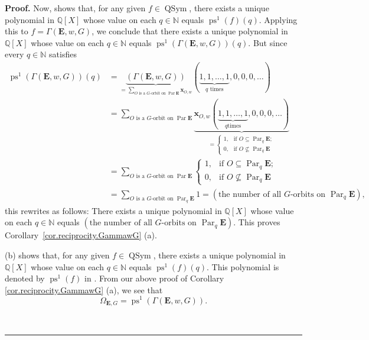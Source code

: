 \documentclass[numbers=enddot,12pt,final,onecolumn,notitlepage,abstracton]{scrartcl}
\theoremstyle{definition}
\newenvironment{proof}[1][Proof]{\noindent\textbf{#1.} }{\ \rule{0.5em}{0.5em}}
\let\sumnonlimits\sum
\renewcommand{\sum}{\sumnonlimits\limits}
\newcommand{\xx}{{\mathbf{x}}}
\newcommand{\QSym}{{\operatorname{QSym}}}
\newcommand{\Par}{\operatorname{Par}}
\newcommand{\EE}{{\mathbf{E}}}
\newcommand{\NN}{{\mathbb{N}}}
\newcommand{\QQ}{{\mathbb{Q}}}
\begin{document}
\begin{proof}
Now, \cite[Proposition 7.1.7 (i)]{Reiner} shows that, for any given
$f\in \QSym $, there exists a unique polynomial in $\QQ
\left[  X\right]  $ whose value on each $q\in \NN $ equals
$\operatorname{ps}^{1}\left(  f\right)  \left(  q\right)  $.
Applying this to $f=\Gamma\left(   \EE ,w,G\right)  $, we conclude that
there exists a unique polynomial in $\QQ \left[  X\right]  $ whose value
on each $q\in \NN $ equals $\operatorname{ps}^{1}\left(
\Gamma\left(   \EE ,w,G\right)  \right)  \left(  q\right)  $. But since
every $q\in \NN $ satisfies
\begin{align}
\operatorname{ps}^{1}\left(  \Gamma\left(   \EE ,w,G\right)
\right)  \left(  q\right)   &  =\underbrace{\left(  \Gamma\left( \EE
,w,G\right)  \right)  }_{=\sum_{O\text{ is a }G\text{-orbit on }
\Par \EE } \xx_{O,w}}\left(
\underbrace{1,1,\ldots,1}_{q\text{ times}},0,0,0,\ldots\right) \nonumber\\
&  =\sum_{O\text{ is a }G\text{-orbit on } \Par \EE}
\underbrace{\xx_{O,w}\left(  \underbrace{1,1,\ldots,1}_{q\text{
times}},0,0,0,\ldots\right)  }_{=%
\begin{cases}
1, & \text{if }O\subseteq \Par_q \EE ;\\
0, & \text{if }O\not \subseteq \Par_q \EE
\end{cases}
}\nonumber\\
&  =\sum_{O\text{ is a }G\text{-orbit on } \Par \EE }
\begin{cases}
1, & \text{if }O\subseteq \Par_q \EE ;\\
0, & \text{if }O\not \subseteq \Par_q \EE
\end{cases}
\nonumber\\
& = \sum_{O\text{ is a }G\text{-orbit on } \Par_{q} \EE} 1
=\left(  \text{the number of all }G\text{-orbits on }
\Par_q \EE \right)  ,
\label{pf.cor.reciprocity.GammawG.a.1}
\end{align}
this rewrites as follows: There exists a unique polynomial in $\QQ
\left[  X\right]  $ whose value on each $q\in \NN $ equals $\left(
\text{the number of all }G\text{-orbits on } \Par_q \EE
\right)  $. This proves Corollary~\ref{cor.reciprocity.GammawG} (a).

(b) \cite[Proposition 7.1.7 (i)]{Reiner} shows that, for any given
$f\in \QSym $, there exists a unique polynomial in $\QQ
\left[  X\right]  $ whose value on each $q\in \NN $ equals
$\operatorname{ps}^{1}\left(  f\right)  \left(  q\right)  $. This
polynomial is denoted by $\operatorname{ps}^{1}\left(  f\right)  $
in \cite[Proposition 7.1.7]{Reiner}. From our above proof of Corollary
\ref{cor.reciprocity.GammawG} (a), we see that
\[
\Omega_{\mathbf{E},G}=\operatorname{ps}^{1}\left(  \Gamma\left(
 \EE ,w,G\right)  \right)  .
\]



\end{proof}
\end{document}
